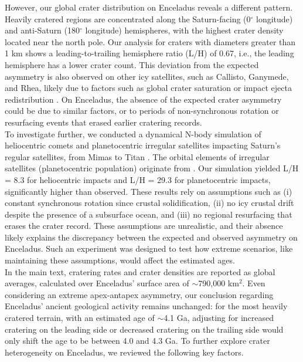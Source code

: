 \documentclass[preprint,12pt,3p,times,authoryear]{elsarticle}
\begin{document}
{However, our global crater distribution on Enceladus reveals a different pattern. Heavily cratered regions are concentrated along the Saturn-facing (0$^\circ$ longitude) and anti-Saturn (180$^\circ$ longitude) hemispheres, with the highest crater density located near the north pole. Our analysis for craters with diameters greater than 1 km shows a leading-to-trailing hemisphere ratio (L/H) of 0.67, i.e., the leading hemisphere has a lower crater count. This deviation from the expected asymmetry is also observed on other icy satellites, such as Callisto, Ganymede, and Rhea, likely due to factors such as global crater saturation or impact ejecta redistribution \citep{Zahnle2003,Xu2017,Schenk2020}. On Enceladus, the absence of the expected crater asymmetry could be due to similar factors, or to periods of non-synchronous rotation or resurfacing events that erased earlier cratering records.\\

To investigate further, we conducted a dynamical N-body simulation of heliocentric comets and planetocentric irregular satellites impacting Saturn's regular satellites, from Mimas to Titan \citep{Wong2021}. The  orbital elements of irregular satellites (planetocentric population) originate from \citet{Nesvorny2007}. Our simulation yielded L/H = 8.3 for heliocentric impacts and L/H = 29.3 for planetocentric impacts, significantly higher than observed. These results rely on assumptions such as (i) constant synchronous rotation since crustal solidification, (ii) no icy crustal drift despite the presence of a subsurface ocean, and (iii) no regional resurfacing that erases the crater record. These assumptions are unrealistic, and their absence likely explains the discrepancy between the expected and observed asymmetry on Enceladus. Such an experiment was designed to test how extreme scenarios, like maintaining these assumptions, would affect the estimated ages.\\

In the main text, cratering rates and crater densities are reported as global averages, calculated over Enceladus' surface area of $\sim$790,000 km$^2$. Even considering an extreme apex-antapex asymmetry, our conclusion regarding Enceladus' ancient geological activity remains unchanged: for the most heavily cratered terrain, with an estimated age of $\sim$4.1 Ga, adjusting for increased cratering on the leading side or decreased cratering on the trailing side would only shift the age to be between 4.0 and 4.3 Ga. To further explore crater heterogeneity on Enceladus, we reviewed the following key factors.\\

}
\end{document}
